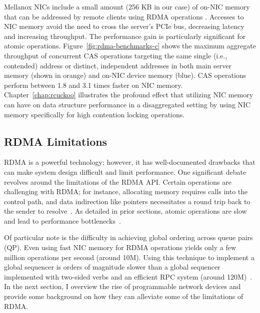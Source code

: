 \documentclass[12pt]{ucsddissertation}
\begin{document}
Mellanox NICs include a small amount (256 KB in our case) of on-NIC memory that can be addressed by
remote clients using RDMA operations \cite{device-memory}. Accesses to NIC memory avoid the need to
cross the server's PCIe bus, decreasing latency and increasing throughput. The performance gain is
particularly significant for atomic operations. Figure~\ref{fig:rdma-benchmarks-c} shows the maximum aggregate
throughput of concurrent CAS operations targeting the same single (i.e., contended) address or
distinct, independent addresses in both main server memory (shown in orange) and on-NIC device
memory (blue). CAS operations perform between 1.8 and 3.1 times faster on NIC memory.
Chapter~\ref{chap:rcuckoo} illustrates the profound effect that utilizing NIC memory can have on data
structure performance in a disaggregated setting by using NIC memory specifically for high
contention locking operations.

\subsection{RDMA Limitations}

RDMA is a powerful technology; however, it has well-documented drawbacks that can make system design
difficult and limit performance. One significant debate revolves around the limitations of the RDMA
API. Certain operations are challenging with RDMA; for instance, allocating memory requires calls
into the control path, and data indirection like pointers necessitates a round trip back to the
sender to resolve~\cite{prism}. As detailed in prior sections, atomic operations are slow and lead
to performance bottlenecks~\cite{design-guidelines}.

Of particular note is the difficulty in achieving global ordering across queue pairs (QP). Even using fast NIC
memory for RDMA operations yields only a few million operations per second (around 10M). Using this
technique to implement a global sequencer is orders of magnitude slower than a global sequencer
implemented with two-sided verbs and an efficient RPC system (around 120M)~\cite{design-guidelines}.
In the next section, I overview the rise of programmable network devices and provide some background
on how they can alleviate some of the limitations of RDMA.


\end{document}
